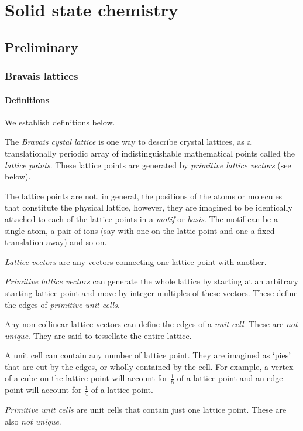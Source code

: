 \chapter{Solid state chemistry}
\section{Preliminary}
\subsection{Bravais lattices}
\subsubsection{Definitions}
We establish definitions below.
\begin{defi}
The \emph{Bravais cystal lattice} is one way to describe crystal lattices, as a translationally periodic array of indistinguishable mathematical points called the \emph{lattice points}. These lattice points are generated by \emph{primitive lattice vectors} (see below).
\end{defi}
\begin{defi}
The lattice points are not, in general, the positions of the atoms or molecules that constitute the physical lattice, however, they are imagined to be identically attached to each of the lattice points in a \emph{motif} or \emph{basis}. The motif can be a single atom, a pair of ions (say with one on the lattic point and one a fixed translation away) and so on.
\end{defi}
\begin{defi}
\emph{Lattice vectors} are any vectors connecting one lattice point with another.
\end{defi}
\begin{defi}
\emph{Primitive lattice vectors} can generate the whole lattice by starting at an arbitrary starting lattice point and move by integer multiples of these vectors. These define the edges of \emph{primitive unit cells}.
\end{defi}
\begin{defi}
Any non-collinear lattice vectors can define the edges of a \emph{unit cell}. These are \emph{not unique}. They are said to tessellate the entire lattice.
\end{defi}
\begin{defi}
A unit cell can contain any number of lattice point. They are imagined as `pies' that are cut by the edges, or wholly contained by the cell. For example, a vertex of a cube on the lattice point will account for $\frac{1}{8}$ of a lattice point and an edge point will account for $\frac{1}{4}$ of a lattice point.
\end{defi}
\begin{defi}
\emph{Primitive unit cells} are unit cells that contain just one lattice point. These are also \emph{not unique}. 
\end{defi}
